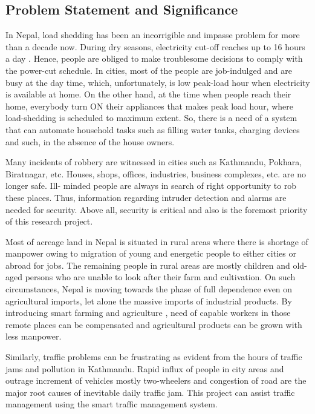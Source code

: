 \documentclass[journal,twoside]{IEEEtran}
\begin{document}
\subsection{Problem Statement and Significance}
In Nepal, load shedding has been an incorrigible and
impasse problem for more than a decade now. During dry
seasons, electricity cut-off reaches up to 16 hours a day \cite{NEA2016}.
Hence, people are obliged to make troublesome decisions to
comply with the power-cut schedule. In cities, most of the
people are job-indulged and are busy at the day time, which,
unfortunately, is low peak-load hour when electricity is
available at home. On the other hand, at the time when people
reach their home, everybody turn ON their appliances that
makes peak load hour, where load-shedding is scheduled to
maximum extent. So, there is a need of a system that can
automate household tasks such as filling water tanks, charging
devices and such, in the absence of the house owners.

Many incidents of robbery are witnessed in cities such as
Kathmandu, Pokhara, Biratnagar, etc. Houses, shops, offices,
industries, business complexes, etc. are no longer safe. Ill-
minded people are always in search of right opportunity to rob
these places. Thus, information regarding intruder detection and
alarms are needed for security. Above all, security is critical and
also is the foremost priority of this research project.

Most of acreage land in Nepal is situated in rural areas
where there is shortage of manpower owing to migration of
young and energetic people to either cities or abroad for jobs.
The remaining people in rural areas are mostly children and old-aged persons who are unable to look after their farm and
cultivation. On such circumstances, Nepal is moving towards
the phase of full dependence even on agricultural imports, let
alone the massive imports of industrial products. By introducing
smart farming and agriculture \cite{Dan2015}, need of capable workers in
those remote places can be compensated and agricultural
products can be grown with less manpower.

Similarly, traffic problems can be frustrating as evident
from the hours of traffic jams and pollution in Kathmandu.
Rapid influx of people in city areas and outrage increment of
vehicles mostly two-wheelers and congestion of road are the
major root causes of inevitable daily traffic jam. This project
can assist traffic management using the smart traffic
management system.
\end{document}
